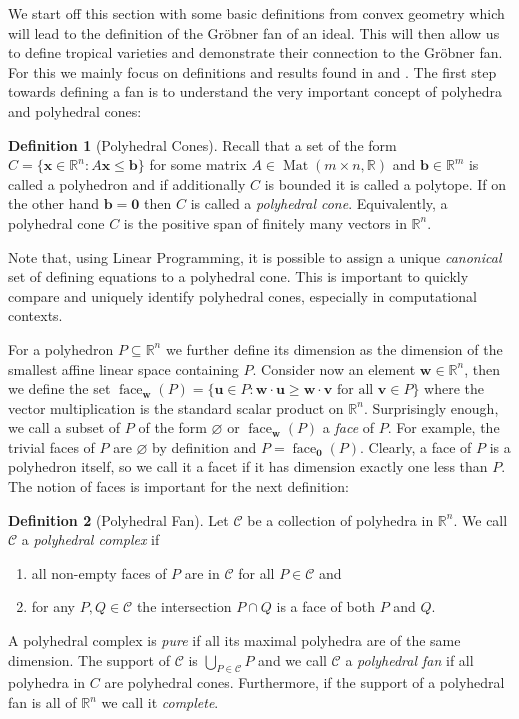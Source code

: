 \documentclass[
  paper=a4,
  titlepage,
  bibliography=totoc,
  listof=totoc,
  pagesize=pdftex
]{scrartcl}
\numberwithin{figure}{section}
\numberwithin{equation}{section}
\numberwithin{table}{section}
\newcommand*\setR{\mathds{R}}
\let\vec\mathbf
\DeclareMathOperator{\Mat}{Mat}
\DeclareMathOperator{\face}{face}
\theoremstyle{definition}
\newtheorem{definition}{Definition}
\numberwithin{definition}{section}
\begin{document}
We start off this section with some basic definitions from convex geometry which will lead
to the definition of the Gröbner fan of an ideal. This will then allow us to define
tropical varieties and demonstrate their connection to the Gröbner fan. For this we mainly
focus on definitions and results found in \cite{compGrobFan} and \cite{SturmGBCP}. The
first step towards defining a fan is to understand the very important concept of polyhedra
and polyhedral cones:

\begin{definition}[Polyhedral Cones]
  \label{def:polyhedralCone}
  Recall that a set of the form $C = \{ \vec x \in \setR^n : A\vec x \leq \vec b \}$ for
  some matrix $A \in \Mat(m\times n, \setR)$ and $\vec b \in \setR^m$ is called a
  polyhedron and if additionally $C$ is bounded it is called a polytope. If on the other
  hand $\vec b = \vec 0$ then $C$ is called a \emph{polyhedral cone}. Equivalently, a
  polyhedral cone $C$ is the positive span of finitely many vectors in $\setR^n$.
\end{definition}

Note that, using Linear Programming, it is possible to assign a unique \emph{canonical}
set of defining equations to a polyhedral cone. This is important to quickly compare and
uniquely identify polyhedral cones, especially in computational contexts.

For a polyhedron $P \subseteq \setR^n$ we further define its dimension as the dimension of
the smallest affine linear space containing $P$. Consider now an element $\vec w \in
\setR^n$, then we define the set $\face_{\vec w}(P) = \{ \vec u \in P : \vec w\cdot \vec u
\geq \vec w \cdot \vec v \text{ for all } \vec v\in P\}$ where the vector multiplication
is the standard scalar product on $\setR^n$. Surprisingly enough, we call a subset of $P$
of the form $\varnothing$ or $\face_{\vec w}(P)$ a \emph{face} of $P$. For example, the
trivial faces of $P$ are $\varnothing$ by definition and $P = \face_{\vec 0}(P)$. Clearly,
a face of $P$ is a polyhedron itself, so we call it a facet if it has dimension exactly
one less than $P$. The notion of faces is important for the next definition:

\begin{definition}[Polyhedral Fan]
  \label{def:polyhedralFan}
  Let $\mathcal C$ be a collection of polyhedra in $\setR^n$. We call $\mathcal C$ a
  \emph{polyhedral complex} if
  \begin{enumerate}
    \item all non-empty faces of $P$ are in $\mathcal C$ for all $P \in \mathcal C$ and
    \item for any $P,Q \in \mathcal C$ the intersection $P\cap Q$ is a face of both $P$
      and $Q$.
  \end{enumerate}
  A polyhedral complex is \emph{pure} if all its maximal polyhedra are of the same
  dimension. The support of $\mathcal C$ is $\bigcup_{P\in\mathcal C}P$ and we call
  $\mathcal C$ a \emph{polyhedral fan} if all polyhedra in $C$ are polyhedral cones.
  Furthermore, if the support of a polyhedral fan is all of $\setR^n$ we call it
  \emph{complete}.
\end{definition}
\end{document}
